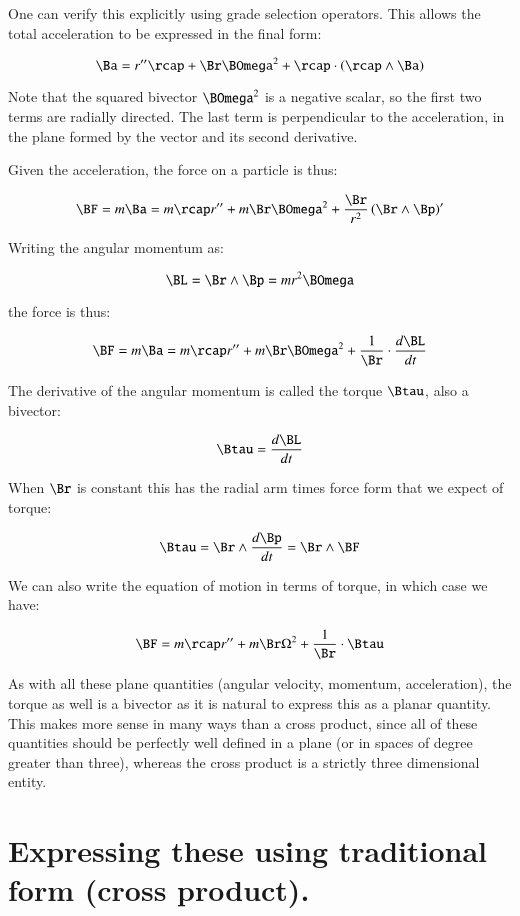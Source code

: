 One can verify this explicitly using grade selection operators.  This allows the total acceleration to be expressed
in the final form:

\begin{equation*}
\Ba = r'' \rcap + \Br \BOmega^2 + \rcap \cdot \left(\rcap \wedge \Ba\right)
\end{equation*}

Note that the squared bivector $\BOmega^2$ is a negative scalar, so the first two terms are radially directed.
The last term is perpendicular to the acceleration, in the plane formed by the vector and its second derivative.

Given the acceleration, the force on a particle is thus:

\[
\BF = m\Ba = m\rcap r'' + m \Br \BOmega^2 + \frac{\Br}{r^2} \left(\Br \wedge \Bp\right)'
\]

Writing the angular momentum as:

\[
\BL = \Br \wedge \Bp = m r^2 \BOmega
\]

the force is thus:

\[
\BF = m\Ba = m\rcap r'' + m \Br \BOmega^2 + \frac{1}{\Br} \cdot \frac{d\BL}{dt}
\]

The derivative of the angular momentum is called the torque $\Btau$, also a bivector:

\[
\Btau = \frac{d\BL}{dt}
\]


When $\Br$ is constant this has the radial arm times force form that we expect of torque:

\[
\Btau = \Br \wedge \frac{d \Bp}{dt} = \Br \wedge \BF
\]

%
We can also write the equation of motion in terms of torque, in which case we have:

\[
\BF = m\rcap r'' + m \Br \Omega^2 + \frac{1}{\Br} \cdot \Btau
\]

As with all these plane quantities (angular velocity, momentum, acceleration), the torque as well is a bivector as it is natural to express this as a planar quantity.  This makes
more sense in many ways than a cross product, since all of these quantities should be perfectly well defined in a plane (or in spaces of degree greater than three), whereas the
cross product is a strictly three dimensional entity.

\section{Expressing these using traditional form (cross product). }

